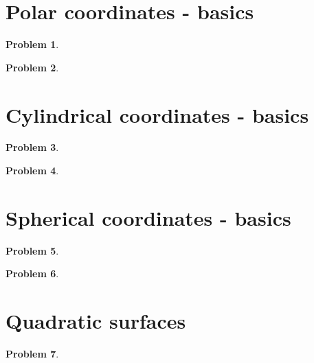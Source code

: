 \documentclass{article}
\newtheorem{problem}{Problem}
\begin{document}
\section{Polar coordinates - basics}

\begin{problem}

\end{problem}



\begin{problem}

\end{problem}
\section{Cylindrical coordinates - basics}

\begin{problem}

\end{problem}

\begin{problem}

\end{problem}
\section{Spherical coordinates - basics}

\begin{problem}

\end{problem}

\begin{problem}

\end{problem}

\section{Quadratic surfaces}

\begin{problem}

\end{problem}
\end{document}
